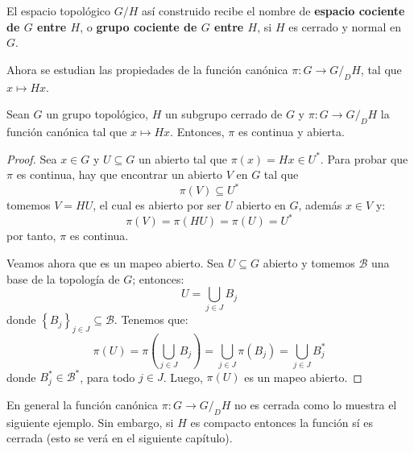 \documentclass[12pt]{report}
\theoremstyle{largebreak}
\newcommand{\cf}[3]{\ensuremath{#1:#2\rightarrow#3}}
\begin{document}
    \begin{obs}
        El espacio topológico $G/H$ así construido recibe el nombre de \textbf{espacio cociente de $G$ entre $H$}, o \textbf{grupo cociente de $G$ entre $H$}, si $H$ es cerrado y normal en $G$.
    \end{obs}

    Ahora se estudian las propiedades de la función canónica $\cf{\pi}{G}{G/_DH}$, tal que $x\mapsto Hx$.

    \begin{propo}
        Sean $G$ un grupo topológico, $H$ un subgrupo cerrado de $G$ y $\cf{\pi}{G}{G/_DH}$ la función canónica tal que $x\mapsto Hx$. Entonces, $\pi$ es continua y abierta.
    \end{propo}

    \begin{proof}
        Sea $x\in G$ y $U\subseteq G$ un abierto tal que $\pi(x)=Hx\in U^*$. Para probar que $\pi$ es continua, hay que encontrar un abierto $V$ en $G$ tal que
        \begin{equation*}
            \pi(V)\subseteq U^*
        \end{equation*}
        tomemos $V=HU$, el cual es abierto por ser $U$ abierto en $G$, además $x\in V$ y:
        \begin{equation*}
            \pi(V)=\pi(HU)=\pi(U)=U^*
        \end{equation*}
        por tanto, $\pi$ es continua.

        Veamos ahora que es un mapeo abierto. Sea $U\subseteq G$ abierto y tomemos $\mathcal{B}$ una base de la topología de $G$; entonces:
        \begin{equation*}
            U=\bigcup_{ j\in J}B_j
        \end{equation*}
        donde $\left\{B_j \right\}_{j\in J}\subseteq \mathcal{B}$. Tenemos que:
        \begin{equation*}
            \pi(U)=\pi(\bigcup_{ j\in J}B_j)=\bigcup_{ j\in J}\pi(B_j)=\bigcup_{ j\in J}B_j^*
        \end{equation*}
        donde $B_j^*\in\mathcal{B}^*$, para todo $j\in J$. Luego, $\pi(U)$ es un mapeo abierto.
    \end{proof}

    En general la función canónica $\cf{\pi}{G}{G/_DH}$ no es cerrada como lo muestra el siguiente ejemplo. Sin embargo, si $H$ es compacto entonces la función sí es cerrada (esto se verá en el siguiente capítulo).
\end{document}
